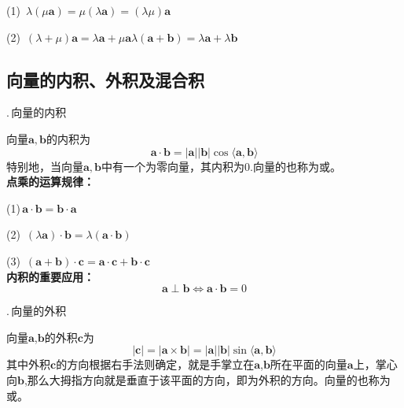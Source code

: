 (1)$\,$  \qquad
$\lambda(\mu\boldsymbol{a})=\mu(\lambda\boldsymbol{a})=(\lambda\mu)\boldsymbol{a}$

(2)$\,$  \qquad
$(\lambda+\mu)\boldsymbol{a}=\lambda\boldsymbol{a}+\mu \boldsymbol{a}$\qquad $\lambda(\boldsymbol{a}+\boldsymbol{b})=\lambda\boldsymbol{a}+\lambda\boldsymbol{b}$


\subsection{向量的内积、外积及混合积}
.$\,$向量的内积


向量$\boldsymbol{a},\boldsymbol{b}$的内积为
\begin{equation}
	\boldsymbol{a}\cdot\boldsymbol{b}=|\boldsymbol{a}||\boldsymbol{b}|\cos\langle\boldsymbol{a},\boldsymbol{b}\rangle
\end{equation}
特别地，当向量$\boldsymbol{a},\boldsymbol{b}$中有一个为零向量，其内积为0.向量的也称为或。\\
\textbf{点乘的运算规律：}

(1)$\,$\qquad $\boldsymbol{a}\cdot\boldsymbol{b}=\boldsymbol{b}\cdot\boldsymbol{a}$

(2)$\,$\qquad
$(\lambda\boldsymbol{a})\cdot\boldsymbol{b}=\lambda(\boldsymbol{a}\cdot\boldsymbol{b})$

(3)$\,$\qquad
$(\boldsymbol{a}+\boldsymbol{b})\cdot\boldsymbol{c}=\boldsymbol{a}\cdot\boldsymbol{c}+\boldsymbol{b}\cdot\boldsymbol{c}$\\[0.5em]
\textbf{内积的重要应用：}
\begin{equation}
	\boldsymbol{a}\perp\boldsymbol{b}\Leftrightarrow \boldsymbol{a}\cdot\boldsymbol{b}=0 
\end{equation}

.$\,$向量的外积

向量$\boldsymbol{a}$,$\boldsymbol{b}$的外积$\boldsymbol{c}$为
\begin{equation}
	|\boldsymbol{c}|=|\boldsymbol{a}\times\boldsymbol{b}|=|\boldsymbol{a}||\boldsymbol{b}|\sin\langle\boldsymbol{a},\boldsymbol{b}\rangle
\end{equation}
其中外积$\boldsymbol{c}$的方向根据右手法则确定，就是手掌立在$\boldsymbol{a}$,$\boldsymbol{b}$所在平面的向量$\boldsymbol{a}$上，掌心向$\boldsymbol{b}$,那么大拇指方向就是垂直于该平面的方向，即为外积的方向。向量的也称为或。\\

